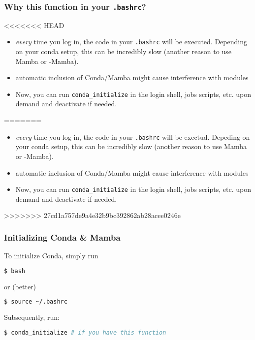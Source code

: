 \begin{frame}[fragile]
  \frametitle{Why this function in your \texttt{.bashrc}?}
<<<<<<< HEAD
  \begin{itemize}[<+->]
  		\item \emph{every} time you log in, the code in your \texttt{.bashrc} will be executed. Depending on your conda setup, this can be incredibly slow (another reason to use Mamba or \textmu-Mamba).
  		\item automatic inclusion of Conda/Mamba might cause interference with modules
  		\item Now, you can run \verb+conda_initialize+ in the login shell, jobs scripts, etc. upon demand and deactivate if needed.
  	\end{itemize}
=======
  \begin{docs}
  	\begin{itemize}[<+->]
  		\item \emph{every} time you log in, the code in your \texttt{.bashrc} will be exectud. Depeding on your conda setup, this can be incredibly slow (another reason to use Mamba or \textmu-Mamba).
  		\item automatic inclusion of Conda/Mamba might cause interference with modules
  		\item Now, you can run \verb+conda_initialize+ in the login shell, jobs scripts, etc. upon demand and deactivate if needed.
  	\end{itemize}
  \end{docs}
>>>>>>> 27cd1a757de9a4e32b9bc392862ab28acee0246e
\end{frame}

\begin{frame}[fragile]
  \frametitle{Initializing Conda \& Mamba}
  To initialize Conda, simply run
  \begin{lstlisting}[language=Bash, style=Shell]
$ bash
  \end{lstlisting}
  or (better)
  \begin{lstlisting}[language=Bash, style=Shell]
$ source ~/.bashrc
  \end{lstlisting}
  Subsequently, run: 
  \begin{lstlisting}[language=Bash, style=Shell]
$ conda_initialize # if you have this function
  \end{lstlisting}
\end{frame}



